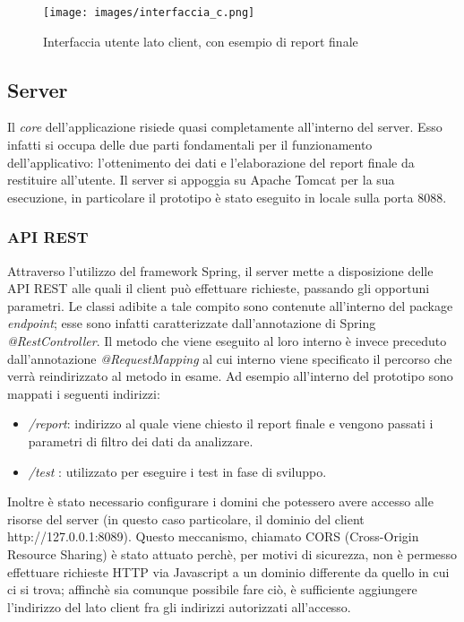 \begin{figure}[h]
    \centering
    \texttt{[image: images/interfaccia\_c.png]}
    \caption{Interfaccia utente lato client, con esempio di report finale}
    \label{fig:interfaccia}
\end{figure}
\newpage
\subsection{Server}
Il \textit{core} dell'applicazione risiede quasi completamente all'interno del server. Esso infatti si occupa delle due parti fondamentali per il funzionamento dell'applicativo: l'ottenimento dei dati e l'elaborazione del report finale da restituire all'utente. Il server si appoggia su Apache Tomcat per la sua esecuzione, in particolare il prototipo è stato eseguito in locale sulla porta 8088. 

\subsubsection{API REST}
Attraverso l'utilizzo del framework Spring, il server mette a disposizione delle API REST alle quali il client può effettuare richieste, passando gli opportuni parametri. Le classi adibite a tale compito sono contenute all'interno del package \textit{endpoint}; esse sono infatti caratterizzate dall'annotazione di Spring \textit{@RestController}. Il metodo che viene eseguito al loro interno è invece preceduto dall'annotazione \textit{@RequestMapping} al cui interno viene specificato il percorso che verrà reindirizzato al metodo in esame. Ad esempio all'interno del prototipo sono mappati i seguenti indirizzi:
\begin{itemize}
    \item \textit{/report}: indirizzo al quale viene chiesto il report finale e vengono passati i parametri di filtro dei dati da analizzare.
    \item \textit{/test} : utilizzato per eseguire i test in fase di sviluppo. 
\end{itemize}

Inoltre è stato necessario configurare i domini che potessero avere accesso alle risorse del server (in questo caso particolare, il dominio del client http://127.0.0.1:8089). Questo meccanismo, chiamato CORS (Cross-Origin Resource Sharing) è stato attuato perchè, per motivi di sicurezza, non è permesso effettuare richieste HTTP via Javascript a un dominio differente da quello in cui ci si trova; affinchè sia comunque possibile fare ciò, è sufficiente aggiungere l'indirizzo del lato client fra gli indirizzi autorizzati all'accesso.

